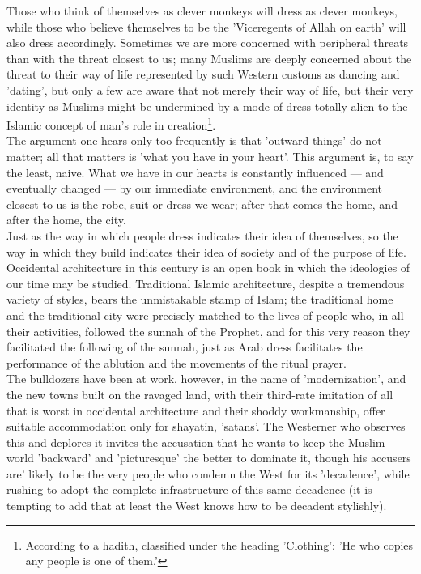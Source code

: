 \documentclass[11pt, b5paper, twoside]{book}
\begin{document}
Those who think of themselves as clever monkeys will dress as clever monkeys, while those who believe 
themselves to be the 'Viceregents of Allah on earth' will also dress accordingly. Sometimes we are 
more concerned with peripheral threats than with the threat closest to us; many Muslims are deeply 
concerned about the threat to their way of life represented by such Western customs as dancing and 
'dating', but only a few are aware that not merely their way of life, but their very identity as 
Muslims might be undermined by a mode of dress totally alien to the Islamic concept of man's role in 
creation\footnote{According to a hadith, classified under the heading 'Clothing': 'He who copies any people is one of them.'}. \\

The argument one hears only too frequently is that 'outward things' do not matter; all that matters 
is 'what you have in your heart'. This argument is, to say the least, naive. What we have in our 
hearts is constantly influenced --- and eventually changed --- by our immediate environment, and the 
environment closest to us is the robe, suit or dress we wear; after that comes the home, and after 
the home, the city. \\

Just as the way in which people dress indicates their idea of themselves, so the way in which they 
build indicates their idea of society and of the purpose of life. Occidental architecture in this 
century is an open book in which the ideologies of our time may be studied. Traditional Islamic 
architecture, despite a tremendous variety of styles, bears the unmistakable stamp of Islam; the 
traditional home and the traditional city were precisely matched to the lives of people who, in all 
their activities, followed the sunnah of the Prophet, and for this very reason they facilitated the 
following of the sunnah, just as Arab dress facilitates the performance of the ablution and the 
movements of the ritual prayer. \\

The bulldozers have been at work, however, in the name of 'modernization', and the new towns built on 
the ravaged land, with their third-rate imitation of all that is worst in occidental architecture and 
their shoddy workmanship, offer suitable accommodation only for shayatin, 'satans'. The Westerner who 
observes this and deplores it invites the accusation that he wants to keep the Muslim world 
'backward' and 'picturesque' the better to dominate it, though his accusers are' likely to be the 
very people who condemn the West for its 'decadence', while rushing to adopt the complete 
infrastructure of this same decadence (it is tempting to add that at least the West knows how to be 
decadent stylishly). \\
\end{document}

